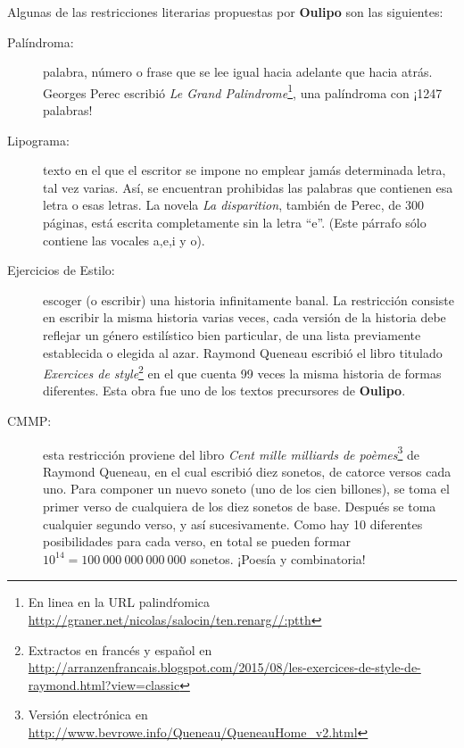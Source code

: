 \documentclass[12pt]{article}
\theoremstyle{definition}
\begin{document}
Algunas de las restricciones literarias propuestas por \textbf{Oulipo} son las 
siguientes:
\begin{description}
 \item[Palíndroma:] palabra, número o frase que se lee igual hacia adelante que 
hacia atrás. Georges Perec escribió \textit{Le Grand Palindrome}\footnote{En 
linea en la URL palindŕomica 
\href{http://graner.net/nicolas/salocin/ten.renarg//:ptth}{
http://graner.net/nicolas/salocin/ten.renarg//:ptth}}, una palíndroma con ¡1247 
palabras! 

\item[Lipograma:] texto en el que el escritor se impone no emplear jamás 
determinada letra, tal vez varias. Así, se encuentran prohibidas las palabras 
que contienen esa letra o esas letras. La novela \textit{La disparition}, 
también de Perec, de 300 páginas, está escrita completamente sin la letra 
``e''. (Este párrafo sólo contiene las vocales a,e,i y o).%

\item[Ejercicios de Estilo:] escoger (o escribir) una historia infinitamente 
banal. La restricción consiste en escribir la misma historia varias veces, cada 
versión de la historia debe reflejar un género estilístico bien particular, de 
una lista previamente establecida o elegida al azar. Raymond Queneau escribió el 
libro titulado \textit{Exercices de style}\footnote{Extractos en francés y español en 
\href{http://arranzenfrancais.blogspot.com/2015/08/les-exercices-de-style-de-raymond.html?view=classic}{http://arranzenfrancais.blogspot.com/2015/08/les-exercices-de-style-de-raymond.html?view=classic}} en el que cuenta 99 veces la 
misma historia de formas diferentes. Esta obra fue uno de los textos precursores 
de \textbf{Oulipo}.

\item[CMMP:] esta restricción proviene del libro \textit{Cent mille milliards de 
poèmes}\footnote{Versión electrónica en 
\href{http://www.bevrowe.info/Queneau/QueneauHome\_v2.html}{
http://www.bevrowe.info/Queneau/QueneauHome\_v2.html}} de Raymond Queneau, en el 
cual escribió diez sonetos, de catorce versos cada uno. Para componer un nuevo 
soneto (uno de los cien billones), se toma el primer verso de cualquiera de los 
diez sonetos de base. Después se toma cualquier segundo verso, y así 
sucesivamente. Como hay 10 diferentes posibilidades para cada verso, en total se 
pueden formar $10^{14}=100\ 000\ 000\ 000\ 000$ sonetos. ¡Poesía y combinatoria!


\end{description}
\end{document}
